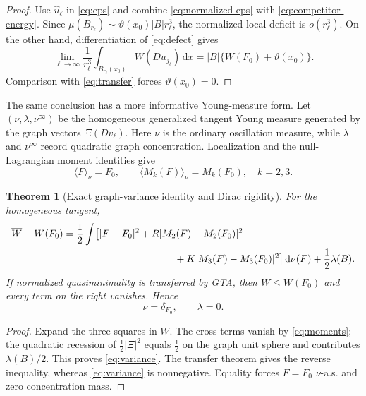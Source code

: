 \documentclass[10pt]{article}
\newtheorem{theorem}{Theorem}[section]
\newcommand{\dd}{\,\mathrm d}
\begin{document}
\begin{proof}
Use $\widehat u_\ell$ in \eqref{eq:eps} and combine
\eqref{eq:normalized-eps} with \eqref{eq:competitor-energy}.  Since
$\mu(B_{r_\ell})\sim\vartheta(x_0)|B|r_\ell^3$, the normalized local deficit
is $o(r_\ell^3)$.  On the other hand, differentiation of
\eqref{eq:defect} gives
\[
 \lim_{\ell\to\infty}\frac1{r_\ell^3}
 \int_{B_{r_\ell}(x_0)}W(Du_{j_\ell})\dd x
 =|B|\{W(F_0)+\vartheta(x_0)\}.
\]
Comparison with \eqref{eq:transfer} forces $\vartheta(x_0)=0$.
\end{proof}

The same conclusion has a more informative Young-measure form.  Let
$(\nu,\lambda,\nu^\infty)$ be the homogeneous generalized tangent Young
measure generated by the graph vectors $\Xi(Dv_\ell)$.  Here $\nu$ is the
ordinary oscillation measure, while $\lambda$ and $\nu^\infty$ record
quadratic graph concentration.  Localization and the null-Lagrangian moment
identities give
\begin{equation}
 \langle F\rangle_\nu=F_0,\qquad
 \langle M_k(F)\rangle_\nu=M_k(F_0),\quad k=2,3.
 \label{eq:moments}
\end{equation}

\begin{theorem}[Exact graph-variance identity and Dirac rigidity]
For the homogeneous tangent,
\begin{align}
 \overline W-W(F_0)
 ={}&\frac12\int\bigl[
 |F-F_0|^2
 +R|M_2(F)-M_2(F_0)|^2\notag\\
 &\hspace{35mm}
 +K|M_3(F)-M_3(F_0)|^2\bigr]\dd\nu(F)
 +\frac12\lambda(B).                                   \label{eq:variance}
\end{align}
If normalized quasiminimality is transferred by GTA, then
$\overline W\leq W(F_0)$ and every term on the right vanishes.  Hence
\begin{equation}
 \boxed{\nu=\delta_{F_0},\qquad\lambda=0.}               \label{eq:Dirac}
\end{equation}
\end{theorem}

\begin{proof}
Expand the three squares in $W$.  The cross terms vanish by
\eqref{eq:moments}; the quadratic recession of
$\frac12|\Xi|^2$ equals $\frac12$ on the graph unit sphere and contributes
$\lambda(B)/2$.  This proves \eqref{eq:variance}.  The transfer theorem gives
the reverse inequality, whereas \eqref{eq:variance} is nonnegative.  Equality
forces $F=F_0$ $\nu$-a.s. and zero concentration mass.
\end{proof}
\end{document}
